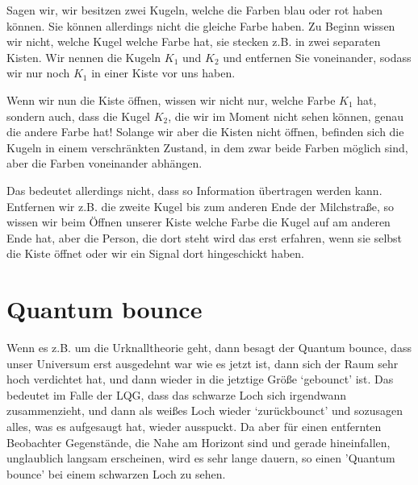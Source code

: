 \documentclass[ngerman]{scrartcl}
\begin{document}
	Sagen wir, wir besitzen zwei Kugeln, welche die Farben blau oder rot haben können. Sie können allerdings nicht die gleiche Farbe haben. 
	Zu Beginn wissen wir nicht, welche Kugel welche Farbe hat, sie stecken z.B. in zwei separaten Kisten. Wir nennen die Kugeln $K_1$ und $K_2$ und entfernen Sie voneinander, sodass wir nur noch $K_1$ in einer Kiste vor uns haben. 
	
	Wenn wir nun die Kiste öffnen, wissen wir nicht nur, welche Farbe $K_1$ hat, sondern auch, dass die Kugel $K_2$, die wir im Moment nicht sehen können, genau die andere Farbe hat! 
	Solange wir aber die Kisten nicht öffnen, befinden sich die Kugeln in einem verschränkten Zustand, in dem zwar beide Farben möglich sind, aber die Farben voneinander abhängen. 
	
	Das bedeutet allerdings nicht, dass so Information übertragen werden kann. Entfernen wir z.B. die zweite Kugel bis zum anderen Ende der Milchstraße, so wissen wir beim Öffnen unserer Kiste welche Farbe die Kugel auf am anderen Ende hat, aber die Person, die dort steht wird das erst erfahren, wenn sie selbst die Kiste öffnet oder wir ein Signal dort hingeschickt haben.

\section{Quantum bounce} \label{QuantumBounce}
	Wenn es z.B. um die Urknalltheorie geht, dann besagt der Quantum bounce, dass unser Universum erst ausgedehnt war wie es jetzt ist, dann sich der Raum sehr hoch verdichtet hat, und dann wieder in die jetztige Größe `gebounct' ist. Das bedeutet im Falle der LQG, dass das schwarze Loch sich irgendwann zusammenzieht, und dann als weißes Loch wieder `zurückbounct' und sozusagen alles, was es aufgesaugt hat, wieder ausspuckt. Da aber für einen entfernten Beobachter Gegenstände, die Nahe am Horizont sind und gerade hineinfallen, unglaublich langsam erscheinen, wird es sehr lange dauern, so einen 'Quantum bounce' bei einem schwarzen Loch zu sehen.  
\end{document}
